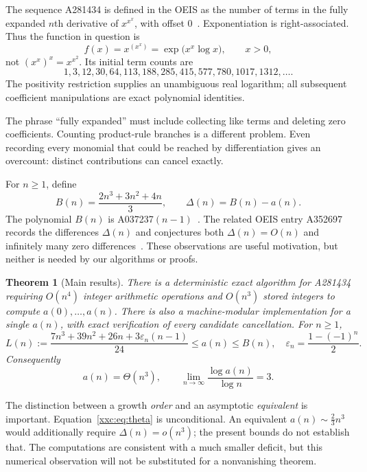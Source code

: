 \documentclass[11pt,a4paper]{article}
\numberwithin{equation}{section}
\newtheorem{theorem}{Theorem}[section]
\theoremstyle{definition}
\theoremstyle{remark}
\theoremstyle{plain}
\newcommand{\epsn}{\varepsilon_n}
\begin{document}
The sequence A281434 is defined in the OEIS as the number of terms in the fully
expanded $n$th derivative of $x^{x^x}$, with offset $0$~\cite{oeis281434}.
Exponentiation is right-associated. Thus the function in question is
\[
 f(x)=x^{(x^x)}=\exp\bigl(x^x\log x\bigr),\qquad x>0,
\]
not $(x^x)^x=x^{x^2}$. Its initial term counts are
\[
1,3,12,30,64,113,188,285,415,577,780,1017,1312,\ldots.
\]
The positivity restriction supplies an unambiguous real logarithm; all
subsequent coefficient manipulations are exact polynomial identities.

The phrase ``fully expanded'' must include collecting like terms and deleting
zero coefficients. Counting product-rule branches is a different problem.
Even recording every monomial that could be reached by differentiation gives
an overcount: distinct contributions can cancel exactly.

For $n\ge1$, define
\begin{equation}\label{xxc:eq:B}
 B(n)=\frac{2n^3+3n^2+4n}{3},\qquad
 \Delta(n)=B(n)-a(n).
\end{equation}
The polynomial $B(n)$ is A037237$(n-1)$~\cite{oeis037237}. The related OEIS
entry A352697 records the differences $\Delta(n)$ and conjectures both
$\Delta(n)=O(n)$ and infinitely many zero differences~\cite{oeis352697}.
These observations are useful motivation, but neither is needed by our
algorithms or proofs.

\begin{theorem}[Main results]\label{xxc:thm:main}
There is a deterministic exact algorithm for A281434 requiring $O(n^4)$
integer arithmetic operations and $O(n^3)$ stored integers to compute
$a(0),\ldots,a(n)$. There is also a machine-modular implementation for a
single $a(n)$, with exact verification of every candidate cancellation.
For $n\ge1$,
\begin{equation}\label{xxc:eq:mainbounds}
 L(n):=\frac{7n^3+39n^2+26n+3\epsn(n-1)}{24}
 \le a(n)\le B(n),
 \quad \epsn=\frac{1-(-1)^n}{2}.
\end{equation}
Consequently
\begin{equation}\label{xxc:eq:theta}
 a(n)=\Theta(n^3),\qquad
 \lim_{n\to\infty}\frac{\log a(n)}{\log n}=3.
\end{equation}
\end{theorem}

The distinction between a growth \emph{order} and an asymptotic
\emph{equivalent} is important. Equation~\eqref{xxc:eq:theta} is unconditional.
An equivalent $a(n)\sim\tfrac23n^3$ would additionally require
$\Delta(n)=o(n^3)$; the present bounds do not establish that. The computations
are consistent with a much smaller deficit, but this numerical observation
will not be substituted for a nonvanishing theorem.
\end{document}
